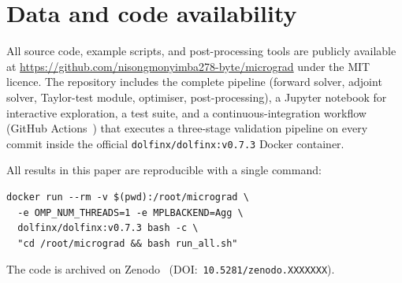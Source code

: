 \section{Data and code availability}
\label{sec:data}

All source code, example scripts, and post-processing tools are publicly
available at
\url{https://github.com/nisongmonyimba278-byte/micrograd}
under the MIT licence.
The repository includes the complete pipeline (forward solver, adjoint
solver, Taylor-test module, optimiser, post-processing), a Jupyter
notebook for interactive exploration, a test suite, and a
continuous-integration workflow (GitHub Actions~\cite{GitHubActions2024})
that executes a three-stage validation pipeline on every commit inside
the official \texttt{dolfinx/dolfinx:v0.7.3} Docker container.

All results in this paper are reproducible with a single command:
\begin{verbatim}
docker run --rm -v $(pwd):/root/micrograd \
  -e OMP_NUM_THREADS=1 -e MPLBACKEND=Agg \
  dolfinx/dolfinx:v0.7.3 bash -c \
  "cd /root/micrograd && bash run_all.sh"
\end{verbatim}
The code is archived on Zenodo~\cite{micrograd2025zenodo}
(DOI:~\texttt{10.5281/zenodo.XXXXXXX}).
